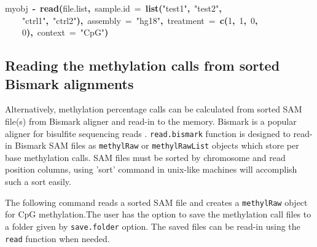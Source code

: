 \documentclass{article}
\makeatletter
\newcommand{\hlnumber}[1]{\textcolor[rgb]{0,0,0}{#1}}%
\newcommand{\hlfunctioncall}[1]{\textcolor[rgb]{.5,0,.33}{\textbf{#1}}}%
\newcommand{\hlstring}[1]{\textcolor[rgb]{.6,.6,1}{#1}}%
\newcommand{\hlkeyword}[1]{\textbf{#1}}%
\newcommand{\hlargument}[1]{\textcolor[rgb]{.69,.25,.02}{#1}}%
\newcommand{\hlassignement}[1]{\textbf{#1}}%
\newcommand{\hlsymbol}[1]{#1}%
\newcommand{\hlstd}[1]{\textcolor[rgb]{0,0,0}{#1}}%
\newenvironment{kframe}{%
 \def\FrameCommand##1{\hskip\@totalleftmargin \hskip-\fboxsep
 \colorbox{shadecolor}{##1}\hskip-\fboxsep
     \hskip-\linewidth \hskip-\@totalleftmargin \hskip\columnwidth}%
 \MakeFramed {\advance\hsize-\width
   \@totalleftmargin\z@ \linewidth\hsize
   \@setminipage}}%
 {\par\unskip\endMakeFramed}
\newenvironment{knitrout}{}{} %
\makeatother
\begin{document}
\begin{knitrout}
{\begin{kframe}
\begin{flushleft}
\hlstd{}\hlsymbol{myobj}{\ }\hlassignement{\usebox{\hlnormalsizeboxlessthan}-}{\ }\hlfunctioncall{read}\hlkeyword{(}\hlsymbol{file.list}\hlkeyword{,}{\ }\hlargument{sample.id}{\ }\hlargument{=}{\ }\hlfunctioncall{list}\hlkeyword{(}\hlstring{"{}test1"{}}\hlkeyword{,}{\ }\hlstring{"{}test2"{}}\hlkeyword{,}\hspace*{\fill}\\
\hlstd{}{\ }{\ }{\ }{\ }\hlstring{"{}ctrl1"{}}\hlkeyword{,}{\ }\hlstring{"{}ctrl2"{}}\hlkeyword{)}\hlkeyword{,}{\ }\hlargument{assembly}{\ }\hlargument{=}{\ }\hlstring{"{}hg18"{}}\hlkeyword{,}{\ }\hlargument{treatment}{\ }\hlargument{=}{\ }\hlfunctioncall{c}\hlkeyword{(}\hlnumber{1}\hlkeyword{,}{\ }\hlnumber{1}\hlkeyword{,}{\ }\hlnumber{0}\hlkeyword{,}\hspace*{\fill}\\
\hlstd{}{\ }{\ }{\ }{\ }\hlnumber{0}\hlkeyword{)}\hlkeyword{,}{\ }\hlargument{context}{\ }\hlargument{=}{\ }\hlstring{"{}CpG"{}}\hlkeyword{)}\mbox{}
\normalfont
\end{flushleft}
\end{kframe}}
\end{knitrout}


\subsection{Reading the methylation calls from sorted  Bismark alignments}
Alternatively, methylation percentage calls can be calculated from
sorted SAM file(s) from Bismark aligner and read-in to the memory. Bismark is a
popular aligner for bisulfite sequencing reads \cite{Krueger2011}. \texttt{read.bismark} function is designed to read-in Bismark SAM files as \texttt{methylRaw} or \texttt{methylRawList} objects which store per base methylation calls. SAM files must be sorted by chromosome and read position columns, using 'sort' command in unix-like machines will accomplish such a sort easily.

The following command reads a sorted SAM file and creates a \texttt{methylRaw} object for CpG methylation.The user has the option to save the methylation call files to a folder given by \texttt{save.folder} option. The saved files can be read-in using the \texttt{read} function when needed. 
\end{document}
